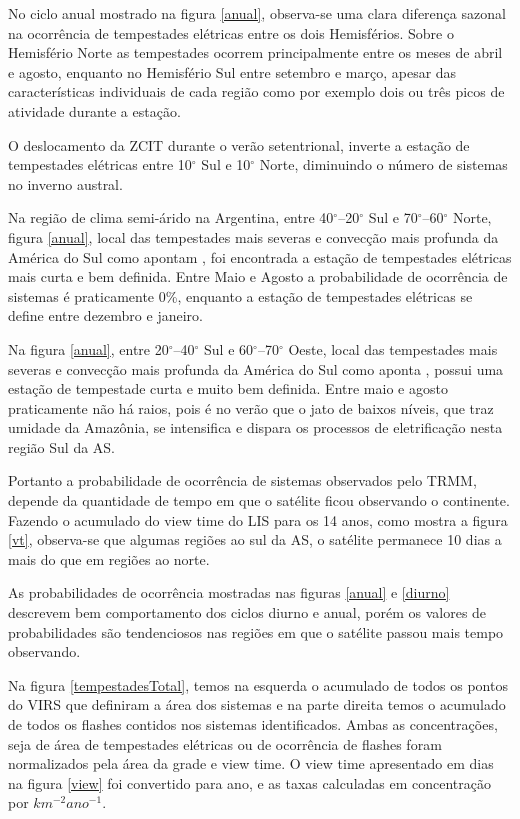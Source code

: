  
No ciclo anual mostrado na figura \ref{anual}, observa-se uma clara diferença sazonal na ocorrência de tempestades elétricas entre os dois Hemisférios. Sobre o Hemisfério Norte as tempestades ocorrem principalmente entre os meses de abril e agosto, enquanto no Hemisfério Sul entre setembro e março, apesar das características individuais de cada região como por exemplo dois ou três picos de atividade durante a estação.

O deslocamento da ZCIT durante o verão setentrional, inverte a estação de tempestades elétricas entre 10$^{\circ}$ Sul e 10$^{\circ}$ Norte, diminuindo o número de sistemas no inverno austral.

Na região de clima semi-árido na Argentina, entre 40$^{\circ}$--20$^{\circ}$ Sul e 70$^{\circ}$--60$^{\circ}$ Norte, figura \ref{anual}, local das tempestades mais severas e convecção mais profunda da América do Sul como apontam , foi encontrada a estação de tempestades elétricas mais curta e bem definida. Entre Maio e Agosto a probabilidade de ocorrência de sistemas é praticamente 0\%, enquanto a estação de tempestades elétricas se define entre dezembro e janeiro.  


Na figura \ref{anual}, entre 20$^{\circ}$--40$^{\circ}$ Sul e 60$^{\circ}$--70$^{\circ}$ Oeste, local das tempestades mais severas e convecção mais profunda da América do Sul como aponta \cite{cecil2005, Romatschke2010}, possui uma estação de tempestade curta e muito bem definida. Entre maio e agosto praticamente não há raios, pois é no verão que o jato de baixos níveis, que traz umidade da Amazônia, se intensifica e dispara os processos de eletrificação nesta região Sul da AS.



Portanto a probabilidade de ocorrência de sistemas observados pelo TRMM, depende da quantidade de tempo em que o satélite ficou observando o continente. Fazendo o acumulado do view time do LIS para os 14 anos, como mostra a figura \ref{vt}, observa-se que algumas regiões ao sul da AS, o satélite permanece 10 dias a mais do que em regiões ao norte.

As probabilidades de ocorrência mostradas nas figuras \ref{anual} e \ref{diurno} descrevem bem comportamento dos ciclos diurno e anual, porém os valores de probabilidades são tendenciosos nas regiões em que o satélite passou mais tempo observando.



Na figura \ref{tempestadesTotal}, temos na esquerda o acumulado de todos os pontos do VIRS que definiram a área dos sistemas e na parte direita temos o acumulado de todos os flashes contidos nos sistemas identificados. Ambas as concentrações, seja de área de tempestades elétricas ou de ocorrência de flashes foram normalizados pela área da grade e view time. O view time apresentado em dias na figura \ref{view} foi convertido para ano, e as taxas calculadas em concentração por $km^{-2}ano^{-1}$.

